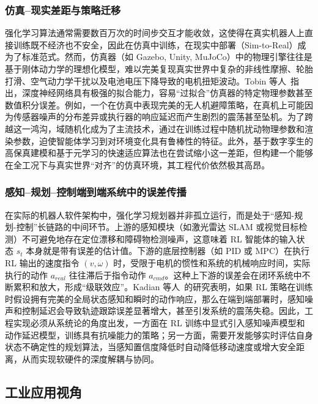 \documentclass[13.5pt]{extarticle}
\begin{document}
\subsubsection{仿真–现实差距与策略迁移}

强化学习算法通常需要数百万次的时间步交互才能收敛，这使得在真实机器人上直接训练既不经济也不安全，因此在仿真中训练，在现实中部署（Sim-to-Real）成为了标准范式。然而，仿真器（如 Gazebo, Unity, MuJoCo）中的物理引擎往往是基于刚体动力学的理想化模型，难以完美复现真实世界中复杂的非线性摩擦、轮胎打滑、空气动力学干扰以及电池电压下降导致的电机扭矩波动。Tobin 等人~\cite{tobin2017domain}指出，深度神经网络具有极强的拟合能力，容易“过拟合”仿真器的特定物理参数甚至数值积分误差。例如，一个在仿真中表现完美的无人机避障策略，在真机上可能因为传感器噪声的分布差异或执行器的响应延迟而产生剧烈的震荡甚至坠机。为了跨越这一鸿沟，域随机化成为了主流技术，通过在训练过程中随机扰动物理参数和渲染参数，迫使智能体学习到对环境变化具有鲁棒性的特征。此外，基于数字孪生的高保真建模和基于元学习的快速适应算法也在尝试缩小这一差距，但构建一个能够在全工况下与真实世界“对齐”的仿真环境，其工程代价依然极其高昂。

\subsubsection{感知–规划–控制端到端系统中的误差传播}

在实际的机器人软件架构中，强化学习规划器并非孤立运行，而是处于“感知-规划-控制”长链路的中间环节。上游的感知模块（如激光雷达 SLAM 或视觉目标检测）不可避免地存在定位漂移和障碍物检测噪声，这意味着 RL 智能体的输入状态 $s_t$ 本身就是带有误差的估计值。下游的底层控制器（如 PID 或 MPC）在执行 RL 输出的速度指令 $(v, \omega)$ 时，受限于电机的惯性和系统的机械响应时间，实际执行的动作 $a_{real}$ 往往滞后于指令动作 $a_{cmd}$。这种上下游的误差会在闭环系统中不断累积和放大，形成“级联效应”。Kadian 等人~\cite{kadian2020sim2real}的研究表明，如果 RL 策略在训练时假设拥有完美的全局状态感知和瞬时的动作响应，那么在端到端部署时，感知噪声和控制延迟会导致轨迹跟踪误差显著增大，甚至引发系统的震荡失稳。因此，工程实现必须从系统论的角度出发，一方面在 RL 训练中显式引入感知噪声模型和动作延迟模型，训练具有抗噪能力的策略；另一方面，需要开发能够实时评估自身状态不确定性的规划算法，当感知置信度降低时自动降低移动速度或增大安全距离，从而实现软硬件的深度解耦与协同。

\subsection{工业应用视角}
\end{document}
